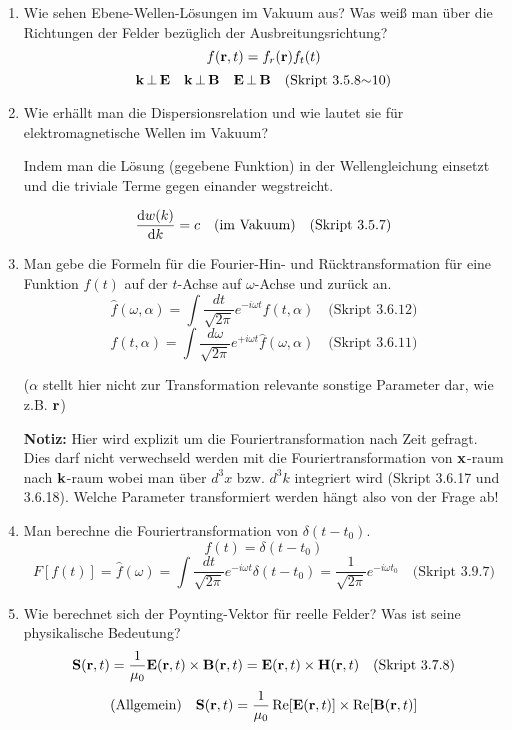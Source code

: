 \documentclass{scrartcl}
\newcommand{\sref}[1]{(Skript #1)}
\newcommand{\smref}[1]{\quad\text{(Skript #1)}}
\begin{document}
\begin{enumerate}
    \item Wie sehen Ebene-Wellen-Lösungen im Vakuum aus? Was weiß man
          über die Richtungen der Felder bezüglich der 
          Ausbreitungsrichtung?
          $$f(\vb r , t)=f_r(\vb r)f_t(t)$$
          $$\vb k \,\bot\, \vb E \quad \vb k\,\bot\,\vb B \quad
          \vb E\,\bot\, \vb B\smref{3.5.8$\sim$10}$$

    \item Wie erhällt man die Dispersionsrelation und wie lautet sie für
          elektromagnetische Wellen im Vakuum?
          \begin{center}
            Indem man die Lösung (gegebene Funktion) in 
            der Wellengleichung einsetzt und die
            triviale Terme gegen einander wegstreicht.
          \end{center}
          $$\dv{w(k)}{k}=c \quad\text{(im Vakuum)}\smref{3.5.7}$$

    \item Man gebe die Formeln für die Fourier-Hin- und Rücktransformation
          für eine Funktion $f(t)$ auf der $t$-Achse auf $\omega$-Achse und
          zurück an.
          $$\hat f(\omega, \alpha)=\int \frac{dt}{\sqrt{2\pi}}
                e^{-i\omega t}f(t, \alpha)\smref{3.6.12}$$
          $$f(t, \alpha)=\int \frac{d\omega}{\sqrt{2\pi}}
                           e^{+i\omega t}\hat f(\omega, \alpha)
                          \smref{3.6.11}$$
          \begin{center}
            ($\alpha$ stellt hier nicht zur Transformation relevante 
            sonstige Parameter dar, wie z.B. $\vb r$)
          \end{center}
          \textbf{Notiz:} Hier wird explizit um die Fouriertransformation 
          nach Zeit gefragt. Dies darf nicht verwechseld werden mit die 
          Fouriertransformation von $\vb x$-raum nach $\vb k$-raum 
          wobei man über
          $d^3x$ bzw. $d^3k$ integriert wird \sref{3.6.17 und 3.6.18}.
          Welche Parameter transformiert werden hängt also von der Frage 
          ab!

    \item Man berechne die Fouriertransformation von $\delta(t-t_0)$.
          $$f(t)=\delta (t-t_0)$$ 
          $$F[f(t)]=\hat f(\omega)
          =\int\frac{dt}{\sqrt{2\pi}}e^{-i\omega t}\delta(t-t_0)
          =\frac{1}{\sqrt{2\pi}}e^{-i\omega t_0}
          \smref{3.9.7}$$ 

    \item Wie berechnet sich der Poynting-Vektor für reelle Felder? Was
          ist seine physikalische Bedeutung?
          $$\vb S(\vb r,t)=\frac{1}{\mu_0}\vb E(\vb r,t)\times\vb B(\vb r,t)
          =\vb E(\vb r,t)\times \vb H(\vb r,t)
          \smref{3.7.8}$$
          $$\text{(Allgemein)}\quad\vb S(\vb r,t)=
          \frac{1}{\mu_0}\Re[\vb E(\vb r,t)]\times \Re[\vb B(\vb r,t)]$$
          

\end{enumerate}
\end{document}
